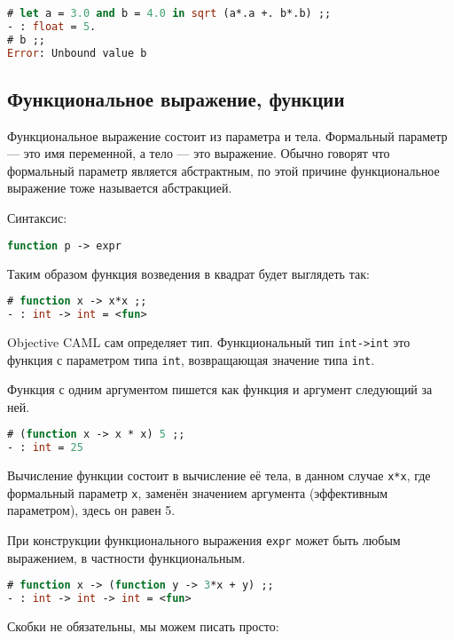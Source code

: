 \begin{lstlisting}[language=OCaml]
# let a = 3.0 and b = 4.0 in sqrt (a*.a +. b*.b) ;;
- : float = 5.
# b ;;
Error: Unbound value b
\end{lstlisting}

\subsection{Функциональное выражение, функции}

Функциональное выражение состоит из параметра и тела. Формальный параметр — это
имя переменной, а тело --- это выражение. Обычно говорят что формальный параметр
является абстрактным, по этой причине функциональное выражение тоже называется
абстракцией.

Синтаксис:

\begin{lstlisting}[language=OCaml]
function p -> expr
\end{lstlisting}

Таким образом функция возведения в квадрат будет выглядеть так:

\begin{lstlisting}[language=OCaml]
# function x -> x*x ;;
- : int -> int = <fun>
\end{lstlisting}

Objective CAML сам определяет тип. Функциональный тип \texttt{int->int} это
функция с параметром типа \texttt{int}, возвращающая значение типа \texttt{int}.

Функция с одним аргументом пишется как функция и аргумент следующий за ней.

\begin{lstlisting}[language=OCaml]
# (function x -> x * x) 5 ;;
- : int = 25
\end{lstlisting}

Вычисление функции состоит в вычисление её тела, в данном случае \texttt{x*x},
где формальный параметр \texttt{x}, заменён значением аргумента (эффективным
параметром), здесь он равен 5.

При конструкции функционального выражения \texttt{expr} может быть любым
выражением, в частности функциональным.

\begin{lstlisting}[language=OCaml]
# function x -> (function y -> 3*x + y) ;;
- : int -> int -> int = <fun>
\end{lstlisting}

Скобки не обязательны, мы можем писать просто:

